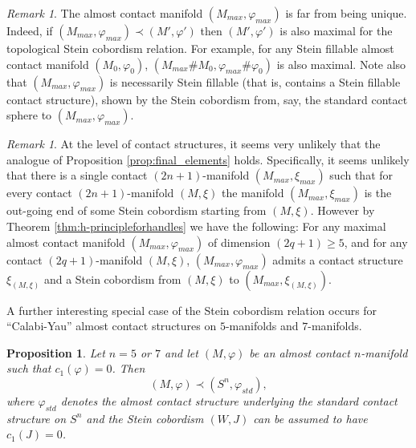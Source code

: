 \documentclass[12pt]{amsart}
\newtheorem{Proposition}[Theorem]{Proposition}
\theoremstyle{remark}
\newtheorem{Remark}[Theorem]{Remark}
\begin{document}
\begin{Remark} \label{rem:maximal_is_not_unique}
The almost contact manifold $(M_{max}, \varphi_{max})$ is far from being unique.
Indeed, if $(M_{max}, \varphi_{max}) \prec (M', \varphi')$ then $(M', \varphi')$ is also maximal for the topological Stein cobordism relation.
For example, for any Stein fillable almost contact manifold $(M_0, \varphi_0)$,
$(M_{max} \# M_0, \varphi_{max} \# \varphi_0)$ is also maximal. Note also that 
$(M_{max}, \varphi_{max})$ is necessarily Stein fillable (that is, contains a Stein fillable
contact structure), shown by the Stein cobordism from, say, the standard contact sphere to 
$(M_{max}, \varphi_{max})$.
\end{Remark}

\begin{Remark} \label{rem:contact_max}
At the level of contact structures, it seems very unlikely that the 
analogue of Proposition \ref{prop:final_elements} holds.
Specifically, it seems unlikely that 
there is a single contact $(2n{+}1)$-manifold $(M_{max}, \xi_{max})$
such that for  every contact $(2n{+}1)$-manifold $(M, \xi)$ the manifold
 $(M_{max}, \xi_{max})$
is the out-going end of some 
Stein cobordism starting from $(M, \xi)$.
%
However by Theorem \ref{thm:h-principleforhandles} we have the following:
For any maximal almost contact manifold  $(M_{max}, \varphi_{max})$ of dimension $(2q{+}1) \geq 5$,
and for any 
contact $(2q{+}1)$-manifold $(M, \xi)$, $(M_{max}, \varphi_{max})$ admits 
a contact structure $\xi_{(M, \xi)}$
and a Stein cobordism from $(M, \xi)$ to $(M_{max}, \xi_{(M, \xi)})$.
\end{Remark}

A further interesting special case of the Stein cobordism relation
occurs for ``Calabi-Yau'' almost contact structures on $5$-manifolds and $7$-manifolds.

\begin{Proposition}\label{Calabi_Yau}
Let $n = 5$ or $7$ and let $(M,\varphi)$ be an almost contact $n$-manifold 
such that $c_1(\varphi) = 0$. Then
$$(M,\varphi) \prec (S^n,\varphi_{std}),$$ where $\varphi_{std}$ denotes
the almost contact structure underlying the standard contact structure on $S^n$ and the Stein cobordism
$(W,J)$ can be assumed to have $c_1(J) = 0$.
\end{Proposition}
\end{document}
